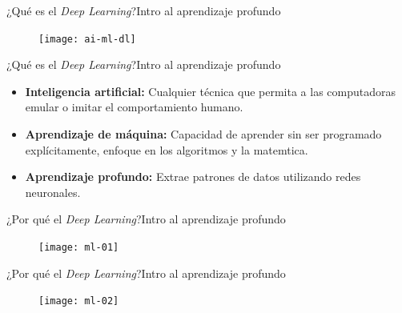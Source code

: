\documentclass[10pt,border=3pt,tikz]{beamer}
\begin{document}
    \begin{frame}{¿Qué es el \textsl{Deep Learning}?}{Intro al aprendizaje profundo}
        \begin{figure}
            \centering
            \texttt{[image: ai-ml-dl]}
        \end{figure}
    \end{frame}
    
    \begin{frame}{¿Qué es el \textsl{Deep Learning}?}{Intro al aprendizaje profundo}
        \begin{center}
            \begin{itemize}
                \item \textbf{Inteligencia artificial:} Cualquier técnica que permita
                a las computadoras emular o imitar el comportamiento humano.
                \item \textbf{Aprendizaje de máquina:} Capacidad de aprender sin ser programado explícitamente, enfoque en los algoritmos y la matemtica.
                \item \textbf{Aprendizaje profundo:} Extrae patrones de datos utilizando redes neuronales.
            \end{itemize}
        \end{center}
    \end{frame}
    
    \begin{frame}{¿Por qué el \textsl{Deep Learning}?}{Intro al aprendizaje profundo}
        \begin{figure}
            \centering
            \texttt{[image: ml-01]}
        \end{figure}
    \end{frame}

    \begin{frame}{¿Por qué el \textsl{Deep Learning}?}{Intro al aprendizaje profundo}
        \begin{figure}
            \centering
            \texttt{[image: ml-02]}
        \end{figure}
    \end{frame}
    
\end{document}
